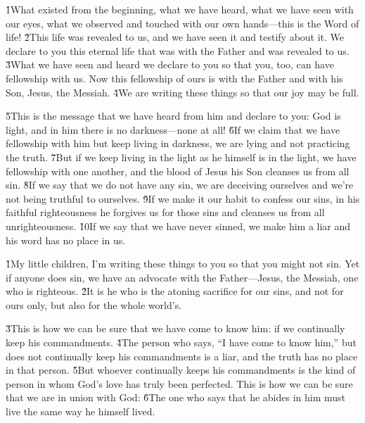 


\v{1}What existed from the beginning, what we have heard, what we have seen with our eyes, what we observed and touched with our own hands---this is the Word of life! \v{2}This life was revealed to us, and we have seen it and testify about it. We declare to you this eternal life that was with the Father and was revealed to us. \v{3}What we have seen and heard we declare to you so that you, too, can have fellowship with us. Now this fellowship of ours is with the Father and with his Son, Jesus, the Messiah. \v{4}We are writing these things so that our joy may be full.

\v{5}This is the message that we have heard from him and declare to you: God is light, and in him there is no darkness---none at all! \v{6}If we claim that we have fellowship with him but keep living in darkness, we are lying and not practicing the truth. \v{7}But if we keep living in the light as he himself is in the light, we have fellowship with one another, and the blood of Jesus his Son cleanses us from all sin. \v{8}If we say that we do not have any sin, we are deceiving ourselves and we're not being truthful to ourselves. \v{9}If we make it our habit to confess our sins, in his faithful righteousness he forgives us for those sins and cleanses us from all unrighteousness. \v{10}If we say that we have never sinned, we make him a liar and his word has no place in us.

\v{1}My little children, I'm writing these things to you so that you might not sin. Yet if anyone does sin, we have an advocate with the Father---Jesus, the Messiah, one who is righteous. \v{2}It is he who is the atoning sacrifice for our sins, and not for ours only, but also for the whole world's.

\v{3}This is how we can be sure that we have come to know him: if we continually keep his commandments. \v{4}The person who says, ``I have come to know him,'' but does not continually keep his commandments is a liar, and the truth has no place in that person. \v{5}But whoever continually keeps his commandments is the kind of person in whom God's love has truly been perfected. This is how we can be sure that we are in union with God: \v{6}The one who says that he abides in him must live the same way he himself lived.

